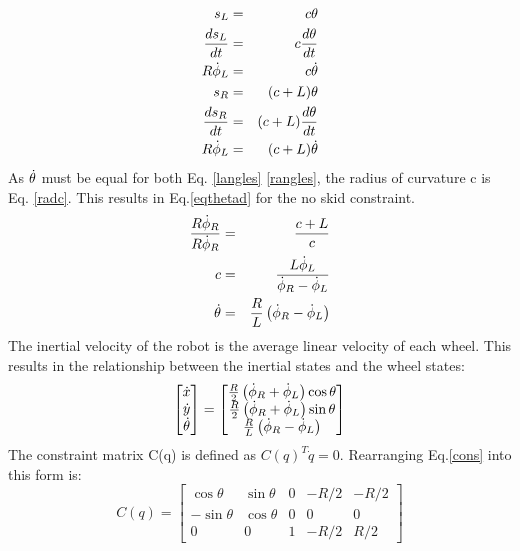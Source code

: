 \documentclass[MTRX3700report.tex]{subfiles}
\begin{document}
\begin{eqnarray}
s_L &=& c\theta \nonumber\\
\frac{ds_L}{dt} &=& c\frac{d\theta}{dt} \nonumber\\ 
R\dot{\phi}_L &=& c\dot{\theta} \label{langles}\\
s_R &=& (c+L)\theta \nonumber\\
\frac{ds_R}{dt} &=& (c+L)\frac{d\theta}{dt} \nonumber\\ 
R\dot{\phi}_L &=& (c+L)\dot{\theta} \label{rangles}
\end{eqnarray}
As $\dot{\theta}$ must be equal for both Eq. \eqref{langles} \eqref{rangles}, the radius of curvature c is Eq. \eqref{radc}. This results in Eq.\eqref{eqthetad} for the no skid constraint.
\begin{eqnarray}
\frac{R\dot{\phi}_R}{R\dot{\phi}_R} &=& \frac{c+L}{c}\nonumber\\
c &=& \frac{L\dot{\phi}_L}{\dot{\phi}_R - \dot{\phi}_L} \label{radc}\\
\dot{\theta} &=& \frac{R}{L}\left( \dot{\phi}_R - \dot{\phi}_L \right) \label{eqthetad}
\end{eqnarray}
The inertial velocity of the robot is the average linear velocity of each wheel. This results in the relationship between the inertial states and the wheel states:
\begin{equation}
\begin{bmatrix}
\dot{x} \\ \dot{y} \\ \dot{\theta}
\end{bmatrix} = 
\begin{bmatrix}
\frac{R}{2}\left( \dot{\phi}_R + \dot{\phi}_L \right)\cos\theta \\
\frac{R}{2}\left( \dot{\phi}_R + \dot{\phi}_L \right)\sin\theta \\
\frac{R}{L}\left( \dot{\phi}_R - \dot{\phi}_L \right) 
\end{bmatrix} \label{cons}
\end{equation}
The constraint matrix C(q) is defined as $C(q)^T\dot{q} = 0$. Rearranging Eq.\eqref{cons} into this form is:
\begin{equation}
C(q) = \begin{bmatrix}
\cos\theta & \sin\theta & 0 & -R/2 & -R/2 \\
-\sin\theta & \cos\theta & 0 & 0  & 0\\
0 & 0 & 1 & -R/2 & R/2
\end{bmatrix}
\end{equation}
\end{document}
